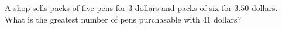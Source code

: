 A shop sells packs of five pens for $3$ dollars and packs of six for $3.50$ dollars. What is the greatest number of pens purchasable with $41$ dollars?
